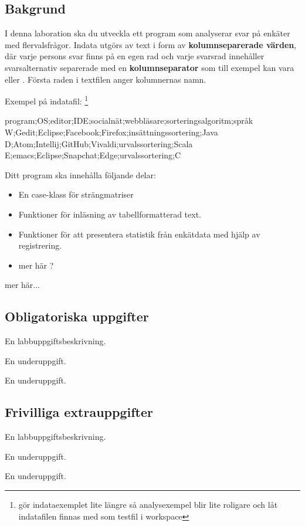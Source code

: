 \subsection{Bakgrund}

I denna laboration ska du utveckla ett program som analyserar svar på enkäter med flervalsfrågor. Indata utgörs av text i form av \textbf{kolumnseparerade värden}, där varje persons svar finns på en egen rad och varje svarsrad innehåller svarsalternativ separerade med en \textbf{kolumnseparator} som till exempel kan vara \code{;} eller \code{\t}. Första raden i textfilen anger kolumnernas namn.

Exempel på indatafil: \footnote{\TODO gör indataexemplet lite längre så analysexempel blir lite roligare och låt indatafilen finnas med som testfil i workspace}
\begin{CodeSmall}[language=, ]
program;OS;editor;IDE;socialnät;webbläsare;sorteringsalgoritm;språk
W;Gedit;Eclipse;Facebook;Firefox;insättningssortering;Java
D;Atom;Intellij;GitHub;Vivaldi;urvalssortering;Scala
E;emacs;Eclipse;Snapchat;Edge;urvalssortering;C
\end{CodeSmall}

Ditt program ska innehålla följande delar:
\begin{itemize}
\item En case-klass för strängmatriser 
\item Funktioner för inläsning av tabellformatterad text.
\item Funktioner för att presentera statistik från enkätdata med hjälp av registrering.
\item \TODO mer här ?
\end{itemize}

\TODO mer här...

\subsection{Obligatoriska uppgifter}

\Task En labbuppgiftsbeskrivning.

\Subtask En underuppgift.

\Subtask En underuppgift.

\subsection{Frivilliga extrauppgifter}
    
\Task En labbuppgiftsbeskrivning.

\Subtask En underuppgift.

\Subtask En underuppgift.

